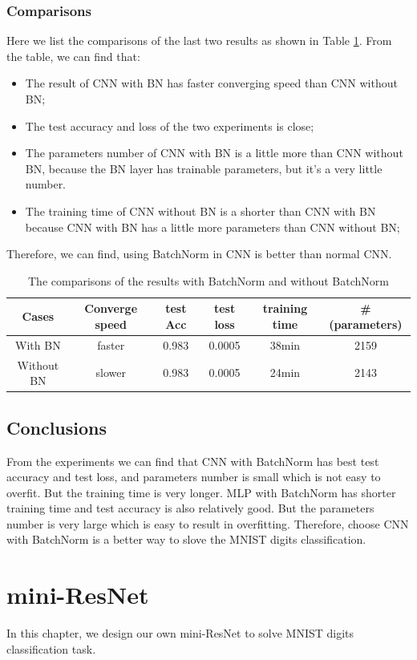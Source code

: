 \documentclass{elegantbook}
\begin{document}
\subsection{Comparisons}
Here we list the comparisons of the last two results as shown in Table \ref{tab2}. From the table, we can find that:
\begin{itemize}
	\item The result of CNN with BN has faster converging speed than CNN without BN;
	\item The test accuracy and loss of the two experiments is close;
	\item The parameters number of CNN with BN is a little more than CNN without BN, because the BN layer has trainable parameters, but it's a very little number. 
	\item The training time of CNN without BN is a shorter than CNN with BN because CNN with BN has a little more parameters than CNN without BN;
\end{itemize}
Therefore, we can find, using BatchNorm in CNN is better than normal CNN.
\begin{table}[!h]
	\centering
	\caption{\label{tab2}The comparisons of the results with BatchNorm and without BatchNorm}
	\begin{tabular}{|c|c|c|c|c|c|}
		\hline
		Cases & Converge speed & test Acc & test loss & training time & \#(parameters) \\
		\hline
		With BN & faster & 0.983 & 0.0005 & 38min & 2159 \\
		\hline
		Without BN & slower & 0.983 & 0.0005 & 24min & 2143 \\
		\hline
	\end{tabular}
\end{table}

\section{Conclusions}
From the experiments we can find that CNN with BatchNorm has best test accuracy and test loss, and parameters number is small which is not easy to overfit. But the training time is very longer. MLP with BatchNorm has shorter training time and test accuracy is also relatively good. But the parameters number is very large which is easy to result in overfitting. Therefore, choose CNN with BatchNorm is a better way to slove the MNIST digits classification.

\chapter{mini-ResNet}
In this chapter, we design our own mini-ResNet to solve MNIST digits classification task.
\end{document}
